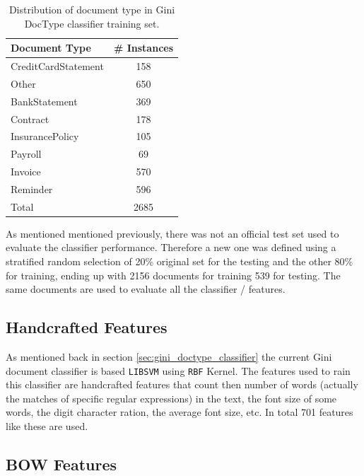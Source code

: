 \begin{table}[h]

  \centering
  \caption{Distribution of document type in  Gini \ac{DocType} classifier training set.}
  \label{tab:doctype_classifier_classes}

\small
\begin{tabular}{|l|c|}
\hline
 \textbf{Document Type}    &  \textbf{\# Instances}  \\
\hline
 CreditCardStatement  &           158  \\
 Other                &           650  \\
 BankStatement        &           369  \\
 Contract             &           178  \\
 InsurancePolicy      &           105  \\
 Payroll              &            69  \\
 Invoice              &           570  \\
 Reminder             &           596  \\
\hline
 Total                &          2685  \\
\hline
\end{tabular}
\end{table}

As mentioned mentioned previously, there was not an official test set used to
evaluate the classifier performance. Therefore a new one was defined using a
stratified random selection of 20\% original  set for the testing and the
other 80\% for training, ending up with 2156 documents for training  539 for
testing. The same documents are used to evaluate all the classifier /
features.


\subsection{Handcrafted Features}
\label{sec:sub_w2v4tc_current_features}

As mentioned back in section  \ref{sec:gini_doctype_classifier} the current
Gini document classifier is based  \texttt{LIBSVM} \cite{CC01a} using 
\texttt{RBF} Kernel.   The features used to rain this classifier are
handcrafted features that count then number of words (actually the matches of
specific regular expressions) in the text, the font size of some
words, the digit character ration, the average font size, etc. In total 701 features like these are used.
 

\subsection{\ac{BOW} Features}
\label{sec:sub_w2v4tc_bow_features}

